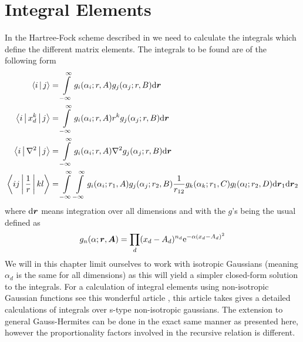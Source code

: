 \section{Integral Elements}
    In the Hartree-Fock scheme described in  we need to
    calculate the integrals which define the different matrix elements. The
    integrals to be found are of the following form
        \begin{equation}
            \begin{aligned}
                \Braket{i|j} &= \int\limits^{\infty}_{-\infty} g_i(\alpha_i;r,A)g_j(\alpha_j;r,B) \mathrm{d}
                \boldsymbol{{r}} \\
                \Braket{i|x^k_d|j} &= \int\limits^{\infty}_{-\infty} g_i(\alpha_i;r,A) r^k
                g_j(\alpha_j;r,B) \mathrm{d} \boldsymbol{{r}} \\
                \Braket{i|\nabla^2|j} &= \int\limits^{\infty}_{-\infty} g_i(\alpha_i;r,A)\nabla^2
                g_j(\alpha_j;r,B) \mathrm{d} \boldsymbol{{r}} \\
                \Braket{ij|\frac{1}{r}|kl} &= \int\limits^{\infty}_{-\infty}\int\limits^{\infty}_{-\infty}
                g_i(\alpha_i;r_1,A)g_j(\alpha_j;r_2,B) \frac{1}{r_{12}}
                g_k(\alpha_k;r_1,C)g_l(\alpha_l;r_2,D) \mathrm{d} \boldsymbol{{r}}_1 \mathrm{d}
                \boldsymbol{{r}}_2\\
            \end{aligned}
        \end{equation}
    where $\mathrm{d}\boldsymbol{{r}}$ means integration over all dimensions and with the
    $g$'s being the usual  defined as
        \begin{equation}
            g_n(\alpha;\boldsymbol{{r}},\boldsymbol{{A}}) = \prod_d (x_d-A_d)^{n_d}
            \mathrm{e}^{-\alpha (x_d-A_d)^2}
            \label{eq:hermiteGauss2}
        \end{equation}
    We will in this chapter limit ourselves to work with isotropic Gaussians
    (meaning $\alpha_d$ is the same for all dimensions) as this will yield a
    simpler closed-form solution to the integrals. For a calculation of
    integral elements using non-isotropic Gaussian functions see this wonderful
    article \cite{nonIsoGauss}, this article takes gives a detailed
    calculations of integrals over s-type non-isotropic gaussians. The
    extension to general Gauss-Hermites can be done in the exact same manner as
    presented here, however the proportionality factors involved in the
    recursive relation is different. \\

